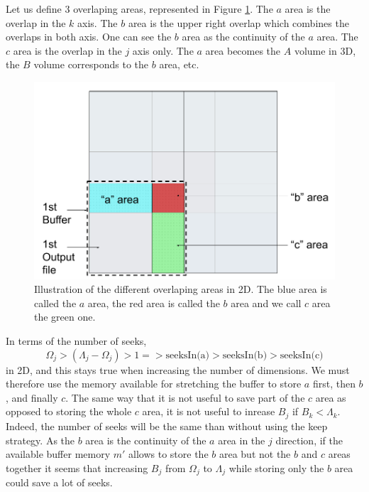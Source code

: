 \documentclass[conference]{IEEEtran}
\begin{document}
Let us define 3 overlaping areas, represented in Figure \ref{fig:areasabc}.
The $a$ area is the overlap in the $k$ axis.
The $b$ area is the upper right overlap which combines the overlaps in both axis.
One can see the $b$ area as the continuity of the $a$ area.
The $c$ area is the overlap in the $j$ axis only.
The $a$ area becomes the $A$ volume in 3D, the $B$ volume corresponds to the $b$ area, etc. \\

\begin{figure}[h]
\centering
\includegraphics[scale=0.20]{./figures/areasabc.png}
\caption{Illustration of the different overlaping areas in 2D.
The blue area is called the $a$ area, the red area is called the $b$ area and we call $c$ area the green one.
}
\label{fig:areasabc}
\end{figure}

In terms of the number of seeks, $$\Omega_j > (\Lambda_j-\Omega_j) > 1 => \textrm{seeksIn(a)} > \textrm{seeksIn(b)} > \textrm{seeksIn(c)}$$ in 2D, and this stays true when increasing the number of dimensions.
We must therefore use the memory available for stretching the buffer to store $a$ first, then $b$, and finally $c$.
The same way that it is not useful to save part of the $c$ area as opposed to storing the whole $c$ area, it is not useful to inrease $B_j$ if $B_k < \Lambda_k$.
Indeed, the number of seeks will be the same than without using the keep strategy.
As the $b$ area is the continuity of the $a$ area in the $j$ direction, if the available buffer memory $m'$ allows to store the $b$ area but not the $b$ and $c$ areas together it seems that increasing $B_j$ from $\Omega_j$ to $\Lambda_j$ while storing only the $b$ area could save a lot of seeks. \\
\end{document}
